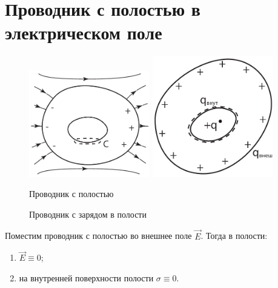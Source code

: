 \section{Проводник с полостью в электрическом поле}
    \begin{figure}[b!]
        \center
        \includegraphics[width=0.47\textwidth]{lec04/holey_conductor.pdf}
        \hfill
        \includegraphics[width=0.47\textwidth]{lec04/q_in_ex.pdf}
        \parbox[t]{.47\textwidth}{\caption{Проводник с полостью}}
        \hfill
        \parbox[t]{.47\textwidth}{\caption{Проводник с зарядом в полости}}
    \end{figure}


    Поместим проводник с полостью во внешнее поле \( \vec{E} \). Тогда в
    полости:
    \begin{enumerate}
        \item \( \vec{E} \equiv 0 \);
        \item на внутренней поверхности полости \( \sigma \equiv 0 \).
    \end{enumerate}

